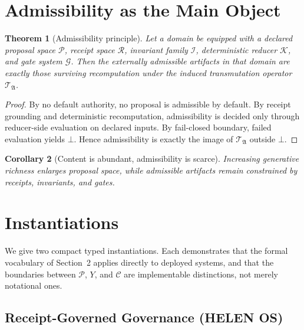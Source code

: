 \documentclass[12pt]{amsart}
\numberwithin{equation}{section}
\newtheorem{theorem}{Theorem}[section]
\newtheorem{corollary}[theorem]{Corollary}
\theoremstyle{definition}
\theoremstyle{remark}
\newcommand{\PP}{\mathcal P}
\newcommand{\RRc}{\mathcal R}
\newcommand{\II}{\mathcal I}
\newcommand{\KK}{\mathcal K}
\newcommand{\GG}{\mathcal G}
\newcommand{\CC}{\mathcal C}
\newcommand{\YY}{Y}
\newcommand{\TT}{\mathcal T}
\begin{document}
\section{Admissibility as the Main Object}

\begin{theorem}[Admissibility principle]
Let a domain be equipped with a declared proposal space $\PP$, receipt space $\RRc$, invariant
family $\II$, deterministic reducer $\KK$, and gate system $\GG$.  Then the externally admissible
artifacts in that domain are exactly those surviving recomputation under the induced transmutation
operator $\TT_{\mathfrak A}$.
\end{theorem}

\begin{proof}
By no default authority, no proposal is admissible by default.  By receipt grounding and
deterministic recomputation, admissibility is decided only through reducer-side evaluation on
declared inputs.  By fail-closed boundary, failed evaluation yields $\bot$.  Hence admissibility
is exactly the image of $\TT_{\mathfrak A}$ outside $\bot$.
\end{proof}

\begin{corollary}[Content is abundant, admissibility is scarce]
Increasing generative richness enlarges proposal space, while admissible artifacts remain
constrained by receipts, invariants, and gates.
\end{corollary}

\section{Instantiations}

We give two compact typed instantiations.  Each demonstrates that the formal vocabulary of
Section~2 applies directly to deployed systems, and that the boundaries between $\PP$, $\YY$,
and $\CC$ are implementable distinctions, not merely notational ones.

\subsection{Receipt-Governed Governance (HELEN OS)}
\end{document}
